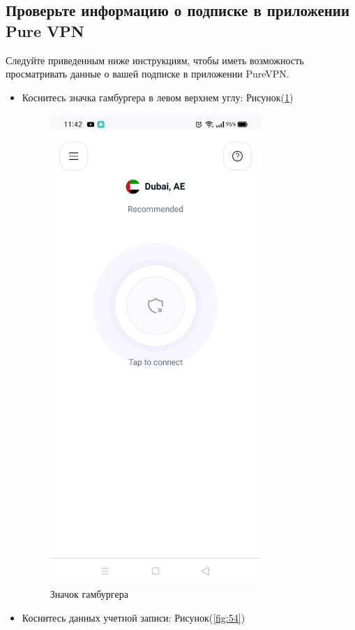 \subsection{Проверьте информацию о подписке в приложении Pure VPN} 
Следуйте приведенным ниже инструкциям, чтобы иметь возможность просматривать данные о вашей подписке в приложении PureVPN.
\begin{itemize}
\item Коснитесь значка гамбургера в левом верхнем углу:  Рисунок(\ref{fig:53})
\begin{figure}[H]
\includegraphics[width=8cm]{35.png}
\centering
\caption{Значок гамбургера}
\label{fig:53}
\end{figure}
\item Коснитесь данных учетной записи:  Рисунок(\ref{fig:54})
\begin{figure}[H]

\end{figure}
\end{itemize}
